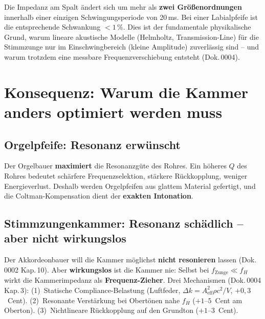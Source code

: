 \documentclass[11pt,a4paper]{article}
\begin{document}
\begin{warnbox}
Die Impedanz am Spalt ändert sich um mehr als \textbf{zwei Größenordnungen} innerhalb einer einzigen Schwingungsperiode von 20\,ms. Bei einer Labialpfeife ist die entsprechende Schwankung $< 1\,\%$. Dies ist der fundamentale physikalische Grund, warum lineare akustische Modelle (Helmholtz, Transmission-Line) für die Stimmzunge nur im Einschwingbereich (kleine Amplitude) zuverlässig sind -- und warum trotzdem eine messbare Frequenzverschiebung entsteht (Dok.\,0004).
\end{warnbox}

\section{Konsequenz: Warum die Kammer anders optimiert werden muss}

\subsection{Orgelpfeife: Resonanz erwünscht}

Der Orgelbauer \textbf{maximiert} die Resonanzgüte des Rohres. Ein höheres $Q$ des Rohres bedeutet schärfere Frequenzselektion, stärkere Rückkopplung, weniger Energieverlust. Deshalb werden Orgelpfeifen aus glattem Material gefertigt, und die Coltman-Kompensation dient der \textbf{exakten Intonation}.

\subsection{Stimmzungenkammer: Resonanz schädlich -- aber nicht wirkungslos}

Der Akkordeonbauer will die Kammer möglichst \textbf{nicht resonieren} lassen (Dok.\,0002 Kap.\,10). Aber \textbf{wirkungslos} ist die Kammer nie: Selbst bei $f_\text{Zunge} \ll f_H$ wirkt die Kammerimpedanz als \textbf{Frequenz-Zieher}. Drei Mechanismen (Dok.\,0004 Kap.\,3): (1)~Statische Compliance-Belastung (Luftfeder, $\Delta k = A_\text{eff}^2 \rho c^2/V$, $+0{,}3$~Cent). (2)~Resonante Verstärkung bei Obertönen nahe $f_H$ ($+1$--$5$~Cent am Oberton). (3)~Nichtlineare Rückkopplung auf den Grundton ($+1$--$3$~Cent).
\end{document}
